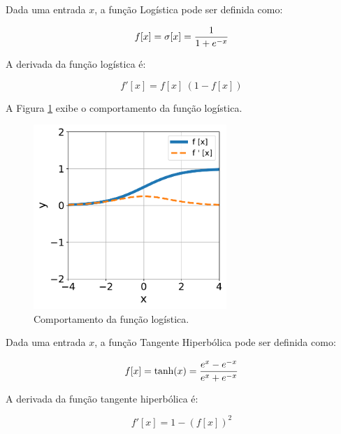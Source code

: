 \linebreak
\newpage


\begin{definition}
    Dada uma entrada $x$, a função Logística pode ser definida como:

    \begin{equation}
        f[x] = \sigma [x] = \dfrac{1}{1 + e^{-x}}
        \vspace{0.2cm}
        \label{eq:ann_logistic_function}
    \end{equation}

    A derivada da função logística é:

    \begin{equation}
        f'[x] = f[x]\ (1 - f[x])
        \label{eq:ann_logistic_function_dy}
    \end{equation}
    
\end{definition}

A Figura \ref{fig:ann_logistic_function} exibe o comportamento da função logística.

\begin{figure}[H]
    \centering
    \includegraphics[width=0.65\textwidth]{figs/ann_logistic_function.pdf}

    \caption{Comportamento da função logística.}
    \label{fig:ann_logistic_function}
\end{figure}


\linebreak
\newpage


\begin{definition}
    Dada uma entrada $x$, a função Tangente Hiperbólica pode ser definida como:

    \begin{equation}
        f[x] = \text{tanh}(x) = \dfrac{e^{x} - e^{-x}}{e^{x} + e^{-x}}
        \vspace{0.2cm}
        \label{eq:ann_tanh_function}
    \end{equation}

    A derivada da função tangente hiperbólica é:

    \begin{equation}
        f'[x] = 1 - (f[x])^{2}
        \label{eq:ann_tanh_function_dy}
    \end{equation}

\end{definition}

